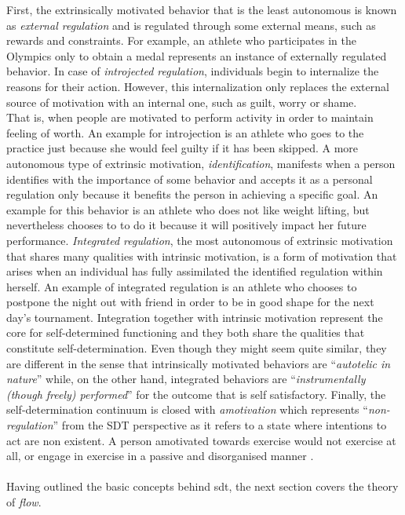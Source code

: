 First, the extrinsically motivated behavior that is the least autonomous is known as \textit{external regulation} and is regulated through some external means, such as rewards and constraints. For example, an athlete who participates in the Olympics only to obtain a medal represents an instance of externally regulated behavior. In case of \textit{introjected regulation}, individuals begin to internalize the reasons for their action. However, this internalization only replaces the external source of motivation with an internal one, such as guilt, worry or shame. \\That is, when people are motivated to perform activity in order to maintain feeling of worth. An example for introjection is an athlete who goes to the practice just because she would feel guilty if it has been skipped. A more autonomous type of extrinsic motivation, \textit{identification}, manifests when a person identifies with the importance of some behavior and accepts it as a personal regulation only because it benefits the person in achieving a specific goal. An example for this behavior is an athlete who does not like weight lifting, but nevertheless chooses to to do it because it will positively impact her future performance. \textit{Integrated regulation}, the most autonomous of extrinsic motivation that shares many qualities with intrinsic motivation, is a form of motivation that arises when an individual has fully assimilated the identified regulation within herself. An example of integrated regulation is an athlete who chooses to postpone the night out with friend in order to be in good shape for the next day's tournament. Integration together with intrinsic motivation represent the core for self-determined functioning and they both share the qualities that constitute self-determination. Even though they might seem quite similar, they are different in the sense that intrinsically motivated behaviors are ``\textit{autotelic in nature}'' while, on the other hand, integrated behaviors are ``\textit{instrumentally (though freely) performed}'' for the outcome that is self satisfactory.  Finally, the self-determination continuum is closed with  \textit{amotivation} which represents ``\textit{non-regulation}'' from the SDT perspective as it refers to a state where intentions to act are non existent. A person amotivated towards exercise would not exercise at all, 
or engage in exercise in a passive and disorganised  manner \cite{deci1994promoting, ryan2000intrinsic, vallerand2007intrinsic}.\\\\
Having outlined the basic concepts behind \acrshort{sdt}, the next section covers the theory of \textit{flow}.
